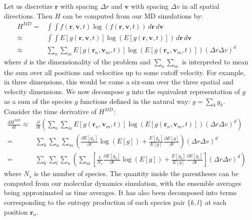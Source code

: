 \documentclass{article}
\begin{document}
Let us discretize $\mathbf{r}$ with spacing $\Delta r$ and $\mathbf{v}$ with spacing $\Delta v$ in all spatial directions. Then $H$ can be computed from our MD simulations by:
\begin{align*}
H^{MD}=&\int\int f(\mathbf{r},\mathbf{v},t)\log(f(\mathbf{r},\mathbf{v},t))\,d\mathbf{r}\,d\mathbf{v}\\
\approx&\int\int E[g(\mathbf{r},\mathbf{v},t)]\log(E[g(\mathbf{r},\mathbf{v},t)])\,d\mathbf{r}\,d\mathbf{v}\\
\approx&\sum_n\sum_m E[g(\mathbf{r}_n,\mathbf{v}_m,t)]\log(E[g(\mathbf{r}_n,\mathbf{v}_m,t)])(\Delta r\Delta v)^d
\end{align*}where $d$ is the dimensionality of the problem and $\sum_n\sum_m$ is interpreted to mean the sum over all positions and velocities up to some cutoff velocity. For example, in three dimensions, this would be come a six-sum over the three spatial and velocity dimensions. We now decompose $g$ into the equivalent representation of $g$ as a sum of the species $g$ functions defined in the natural way: $g=\sum_k g_k$. Consider the time derivative of $H^{MD}$:
\begin{align*}
\frac{d H^{MD}}{d t}\approx&\frac{\partial }{\partial t}\left(\sum_n\sum_m E[g(\mathbf{r}_n,\mathbf{v}_m,t)]\log(E[g(\mathbf{r}_n,\mathbf{v}_m,t)])(\Delta r\Delta v)^d\right)\\
=& \sum_k \sum_n\sum_m \left(\frac{\partial E[g_k]}{\partial t}\log(E[g])+\frac{E[g_k]}{E[g]}\frac{\partial E[g]}{\partial t}\right)(\Delta r\Delta v)^d\\
=&\sum_k\sum_l\sum_n\left(\sum_m\left[\frac{1}{N_s}\frac{\partial E[g_k]}{\partial t}\log(E[g])+\frac{E[g_k]}{E[g]}\frac{\partial E[g_l]}{\partial t}\right](\Delta r\Delta v)^d\right)
\end{align*}where $N_s$ is the number of species. The quantity inside the parentheses can be computed from our molecular dynamics simulation, with the ensemble averages being approximated as time averages. It has also been decomposed into terms corresponding to the entropy production of each species pair $\{k,l\}$ at each position $\mathbf{r}_n$.
\end{document}
